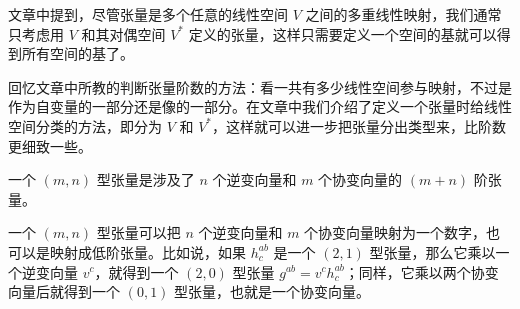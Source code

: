 
\begin{issues}
\issueDraft
\end{issues}


文章中提到，尽管张量是多个任意的线性空间 $V$ 之间的多重线性映射，我们通常只考虑用 $V$ 和其对偶空间 $V^*$ 定义的张量，这样只需要定义一个空间的基就可以得到所有空间的基了。

回忆文章中所教的判断张量阶数的方法：看一共有多少线性空间参与映射，不过是作为自变量的一部分还是像的一部分。在文章中我们介绍了定义一个张量时给线性空间分类的方法，即分为 $V$ 和 $V^*$，这样就可以进一步把张量分出类型来，比阶数更细致一些。

\begin{definition}{}
一个 $(m, n)$ 型张量是涉及了 $n$ 个逆变向量和 $m$ 个协变向量的 $(m+n)$ 阶张量。
\end{definition}

一个 $(m, n)$ 型张量可以把 $n$ 个逆变向量和 $m$ 个协变向量映射为一个数字，也可以是映射成低阶张量。比如说，如果 $h^{ab}_c$ 是一个 $(2, 1)$ 型张量，那么它乘以一个逆变向量 $v^c$，就得到一个 $(2, 0)$ 型张量 $g^{ab}=v^ch^{ab}_c$；同样，它乘以两个协变向量后就得到一个 $(0, 1)$ 型张量，也就是一个协变向量。









